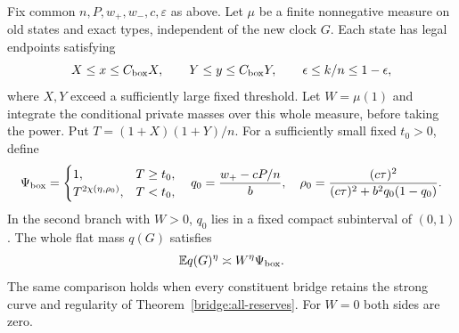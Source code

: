 \begin{theorem}
\label{bridge:posterior}
Fix common $n,P,w_+,w_-,c,\varepsilon$ as above. Let $\mu$ be a
finite nonnegative measure on old states and exact types, independent
of the new clock $G$. Each state has legal endpoints satisfying
\[
 X\le x\le C_{\rm box}X,\qquad
 Y\le y\le C_{\rm box}Y,\qquad
 \epsilon\le k/n\le1-\epsilon,
\]
where $X,Y$ exceed a sufficiently large fixed threshold. Let $W=\mu(1)$
and integrate the conditional private masses over this whole measure,
before taking the power. Put $T=(1+X)(1+Y)/n$. For a sufficiently
small fixed $t_0>0$, define
\begin{equation}
 \Psi_{\rm box}=
 \begin{cases}
 1,&T\ge t_0,\\
 T^{2\chi(\eta,\rho_0)},&T<t_0,
 \end{cases}
 \quad
 q_0=\frac{w_+-cP/n}{b},\quad
 \rho_0=\frac{(c\tau)^2}{(c\tau)^2+b^2q_0(1-q_0)}.
 \label{bridge:box-factor}
\end{equation}
In the second branch with $W>0$, $q_0$ lies in a fixed compact
subinterval of $(0,1)$. The whole flat mass $q(G)$ satisfies
\begin{equation}
 \mathbb E q(G)^\eta\asymp W^\eta\Psi_{\rm box}.
 \label{bridge:whole-mass}
\end{equation}
The same comparison holds when every constituent bridge retains the
strong curve and regularity of Theorem~\ref{bridge:all-reserves}.
For $W=0$ both sides are zero.
\end{theorem}
